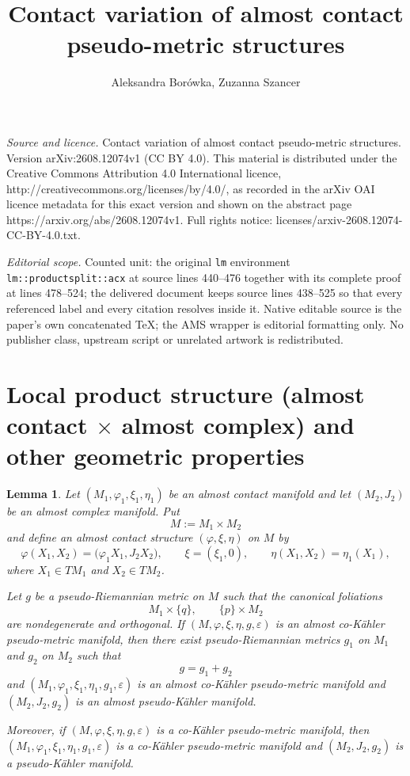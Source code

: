 \documentclass[10pt,a4paper]{amsart}
\numberwithin{equation}{section}
\newtheorem{lm}[tw]{Lemma}
\newcommand{\eps}{\varepsilon}
\begin{document}
\title[Contact variation of almost contact pseudo-metric structures]{Contact variation of almost contact pseudo-metric structures}
\author{Aleksandra Borówka, Zuzanna Szancer}
\date{}
\maketitle
\noindent\emph{Source and licence.} Contact variation of almost contact pseudo-metric structures. Version arXiv:2608.12074v1 (CC BY 4.0). This material is distributed under the Creative Commons Attribution 4.0 International licence, http://creativecommons.org/licenses/by/4.0/, as recorded in the arXiv OAI licence metadata for this exact version and shown on the abstract page https://arxiv.org/abs/2608.12074v1. Full rights notice: licenses/arxiv-2608.12074-CC-BY-4.0.txt.\par\smallskip
\noindent\textit{Editorial scope.} Counted unit: the original \texttt{lm} environment \texttt{lm::productsplit::acx} at source lines 440--476 together with its complete proof at lines 478--524; the delivered document keeps source lines 438--525 so that every referenced label and every citation resolves inside it. Native editable source is the paper's own concatenated TeX; the AMS wrapper is editorial formatting only. No publisher class, upstream script or unrelated artwork is redistributed.
\section{Local product structure (almost contact $\times$ almost complex) and other geometric properties}


\begin{lm}\label{lm::productsplit::acx}
Let $(M_1,\varphi_1,\xi_1,\eta_1)$ be an almost contact manifold and let
$(M_2,J_2)$ be an almost complex manifold. Put
$$
M:=M_1\times M_2
$$
and define an almost contact structure $(\varphi,\xi,\eta)$ on $M$ by
$$
\varphi(X_1,X_2)=\bigl(\varphi_1X_1,J_2X_2\bigr),\qquad
\xi=(\xi_1,0),\qquad
\eta(X_1,X_2)=\eta_1(X_1),
$$
where $X_1\in TM_1$ and $X_2\in TM_2$.

Let $g$ be a pseudo-Riemannian metric on $M$ such that the canonical foliations
$$
M_1\times\{q\},\qquad \{p\}\times M_2
$$
are nondegenerate and orthogonal.
If $(M,\varphi,\xi,\eta,g,\eps)$ is an almost co-K\"ahler pseudo-metric
manifold, then there exist pseudo-Riemannian metrics $g_1$ on $M_1$ and $g_2$ on $M_2$
such that
$$
g=g_1+g_2
$$
and
$(M_1,\varphi_1,\xi_1,\eta_1,g_1,\eps)$
is an almost co-K\"ahler pseudo-metric manifold and
$(M_2,J_2,g_2)$
is an almost pseudo-K\"ahler manifold.

Moreover, if $(M,\varphi,\xi,\eta,g,\eps)$ is a co-K\"ahler pseudo-metric
manifold, then $(M_1,\varphi_1,\xi_1,\eta_1,g_1,\eps)$
is a co-K\"ahler pseudo-metric manifold and
$(M_2,J_2,g_2)$
is a pseudo-K\"ahler manifold.
\end{lm}
\end{document}
